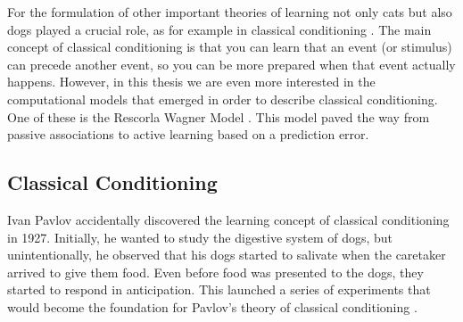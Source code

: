 For the formulation of other important theories of learning not only cats but also dogs played a crucial role, as for example in classical conditioning \citep{pavlov1927conditional}. 
The main concept of classical conditioning is that you can learn that an event (or stimulus) can precede another event, so you can be more prepared when that event actually happens. However, in this thesis we are even more interested in the computational models that emerged in order to describe classical conditioning. One of these is the Rescorla Wagner Model \citep{rescorla1972theory}. This model paved the way from passive associations to active learning based on a prediction error.

\subsection{Classical Conditioning}
Ivan Pavlov accidentally discovered the learning concept of classical conditioning in 1927. Initially, he wanted to study the digestive system of dogs, but unintentionally, he observed that his dogs started to salivate when the caretaker arrived to give them food. Even before food was presented to the dogs, they started to respond in anticipation. This launched a series of experiments that would become the foundation for Pavlov's theory of classical conditioning \citep{pavlov1927conditional}.  

